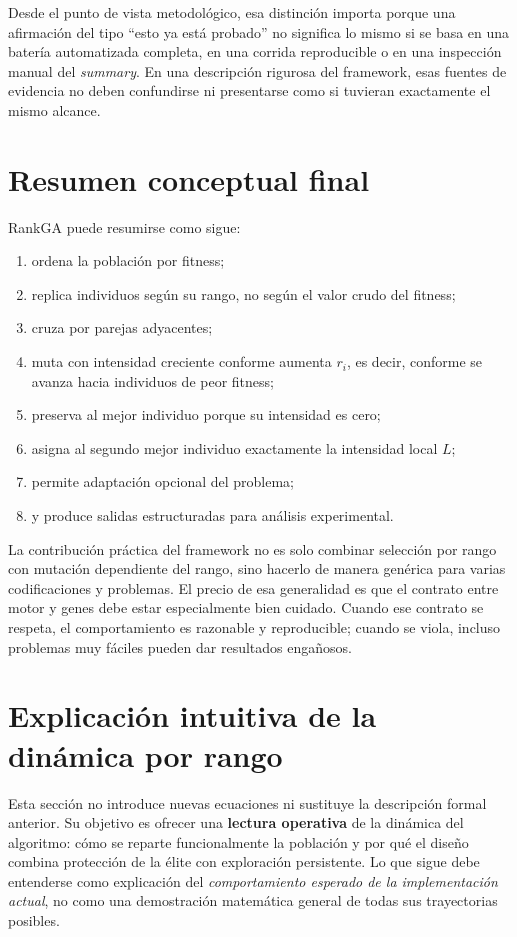 \documentclass[11pt]{article}
\begin{document}
Desde el punto de vista metodol\'ogico, esa distinci\'on importa porque una
afirmaci\'on del tipo ``esto ya est\'a probado'' no significa lo mismo si se
basa en una bater\'ia automatizada completa, en una corrida reproducible o en
una inspecci\'on manual del \emph{summary}. En una descripci\'on rigurosa del
framework, esas fuentes de evidencia no deben confundirse ni presentarse como
si tuvieran exactamente el mismo alcance.

\section{Resumen conceptual final}

RankGA puede resumirse como sigue:

\begin{enumerate}
  \item ordena la poblaci\'on por fitness;
  \item replica individuos seg\'un su rango, no seg\'un el valor crudo del
  fitness;
  \item cruza por parejas adyacentes;
  \item muta con intensidad creciente conforme aumenta \(r_i\), es decir,
  conforme se avanza hacia individuos de peor fitness;
  \item preserva al mejor individuo porque su intensidad es cero;
  \item asigna al segundo mejor individuo exactamente la intensidad local
  \(L\);
  \item permite adaptaci\'on opcional del problema;
  \item y produce salidas estructuradas para an\'alisis experimental.
\end{enumerate}

La contribuci\'on pr\'actica del framework no es solo combinar selecci\'on por
rango con mutaci\'on dependiente del rango, sino hacerlo de manera gen\'erica
para varias codificaciones y problemas. El precio de esa generalidad es que el
contrato entre motor y genes debe estar especialmente bien cuidado. Cuando ese
contrato se respeta, el comportamiento es razonable y reproducible; cuando se
viola, incluso problemas muy f\'aciles pueden dar resultados enga\~nosos.

\section{Explicaci\'on intuitiva de la din\'amica por rango}

Esta secci\'on no introduce nuevas ecuaciones ni sustituye la descripci\'on
formal anterior. Su objetivo es ofrecer una \textbf{lectura operativa} de la
din\'amica del algoritmo: c\'omo se reparte funcionalmente la poblaci\'on y por
qu\'e el dise\~no combina protecci\'on de la \'elite con exploraci\'on
persistente. Lo que sigue debe entenderse como explicaci\'on del
\emph{comportamiento esperado de la implementaci\'on actual}, no como una
demostraci\'on matem\'atica general de todas sus trayectorias posibles.
\end{document}
